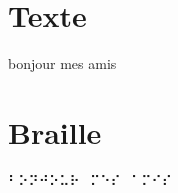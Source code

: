 \documentclass[a4paper,12pt]{article}
\begin{document}
\section*{Texte}
\raggedright
bonjour mes amis\\
\newpage
\section*{Braille}
\raggedright
⠃⠕⠝⠚⠕⠥⠗⠀⠍⠑⠎⠀⠁⠍⠊⠎\\
\end{document}
